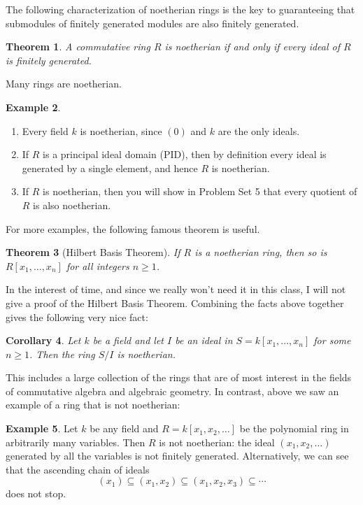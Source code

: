 \documentclass[12pt]{report}
\newtheorem{theorem}{Theorem}[chapter]
\newtheorem{corollary}[theorem]{Corollary}
\numberwithin{equation}{section}
\numberwithin{theorem}{chapter}
\theoremstyle{definition}
\newtheorem{example}[theorem]{Example}
\newtheorem*{basic properties}{Basic Properties}
\newtheorem*{Important Remark}{Important Remark}
\begin{document}
The following characterization of noetherian rings is the key to guaranteeing that submodules of finitely generated modules are also finitely generated.

\begin{theorem}\label{noetherian iff ideals fg}
A commutative ring $R$ is noetherian if and only if every ideal of $R$ is finitely generated.
\end{theorem}

Many rings are noetherian.


\begin{example}$\,$
\begin{enumerate}[label=\alph*)]
\item Every field $k$ is noetherian, since $(0)$ and $k$ are the only ideals.
\item If $R$ is a principal ideal domain (PID), then by definition every ideal is generated by a single element, and hence $R$ is noetherian.
\item If $R$ is noetherian, then you will show in Problem Set 5 that every quotient of $R$ is also noetherian.
\end{enumerate}	
\end{example}
 
For more examples, the following famous theorem is useful.

\begin{theorem}[Hilbert Basis Theorem]  
If $R$ is a noetherian ring, then so is $R[x_1, \ldots, x_n]$ for all integers $n \geqslant 1$. 
\end{theorem}

In the interest of time, and since we really won't need it in this class, I will not give a proof of the Hilbert Basis Theorem.
Combining the facts above together gives the following very nice fact:


\begin{corollary}
Let $k$ be a field and let $I$ be an ideal in $S = k[x_1, \ldots, x_n]$ for some $n \geqslant 1$. Then the ring $S/I$ is noetherian.	
\end{corollary}

This includes a large collection of the rings that are of most interest in the fields of commutative algebra and algebraic geometry. In contrast, above we saw an example of a ring that is not noetherian:

\begin{example}
	Let $k$ be any field and $R = k[x_1, x_2, \ldots]$ be the polynomial ring in arbitrarily many variables. Then $R$ is not noetherian: the ideal $(x_1, x_2, \ldots)$ generated by all the variables is not finitely generated. Alternatively, we can see that the ascending chain of ideals
	$$(x_1) \subseteq (x_1, x_2) \subseteq (x_1, x_2, x_3) \subseteq \cdots$$
does not stop.
\end{example}
\end{document}
